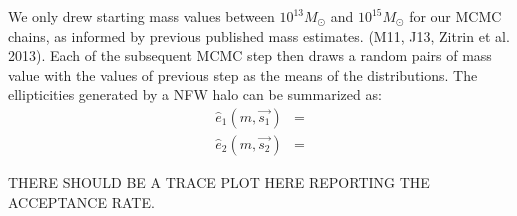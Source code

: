 We only drew starting mass values between
$10^{13} M_\odot$ and $10^{15} M_\odot$ for our MCMC
chains, as informed by previous published mass estimates. (M11, J13, Zitrin et al. 2013). Each of the subsequent MCMC step then
draws a random pairs of mass value with the values of
previous step as the means of the distributions. 
The ellipticities generated by a NFW halo can be summarized as:
\begin{align}
    \hat{e}_1(m, \vec{s_1}) &=\\
    \hat{e}_2(m, \vec{s_2}) &= 
\end{align}

THERE SHOULD BE A TRACE PLOT HERE REPORTING THE ACCEPTANCE RATE.
 
